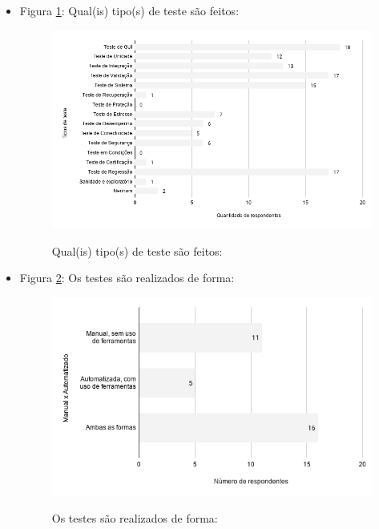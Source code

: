 \begin{itemize}
  
     \item Figura \ref{figure:s_tipostestes}: Qual(is) tipo(s) de teste são feitos:
        \begin{figure}[!htb]
        \centering
        \includegraphics[width=.80\textwidth]{images/s_tipostestes.png}
        \label{figure:s_tipostestes}
        \caption{Qual(is) tipo(s) de teste são feitos:}
        \end{figure}
    
    
     \item Figura \ref{figure:s_formatestes}: Os testes são realizados de forma:
        \begin{figure}[!htb]
        \centering
        \includegraphics[width=.80\textwidth]{images/s_formatestes.png}
        \label{figure:s_formatestes}
        \caption{Os testes são realizados de forma:}
        \end{figure}    
    

\end{itemize}
